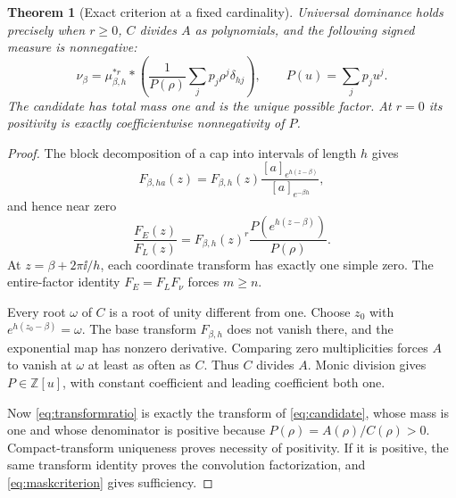 \documentclass[11pt,a4paper]{article}
\newtheorem{theorem}{Theorem}[section]\newtheorem{lemma}[theorem]{Lemma}
\theoremstyle{remark}\newtheorem*{ednote}{Editorial note (ProveIt, 2026-10-01)}
\begin{document}
\begin{theorem}[Exact criterion at a fixed cardinality]\label{thm:fixed}
Universal dominance holds precisely when $r\ge0$, $C$ divides $A$ as polynomials, and the following signed measure is nonnegative:
\begin{equation}\label{eq:candidate}
 \nu_\beta=\mu_{\beta,h}^{*r}*
 \left(\frac1{P(\rho)}\sum_jp_j\rho^j\delta_{hj}\right),
 \qquad P(u)=\sum_jp_ju^j.
\end{equation}
The candidate has total mass one and is the unique possible factor. At $r=0$ its positivity is exactly coefficientwise nonnegativity of $P$.
\end{theorem}
\begin{proof}
The block decomposition of a cap into intervals of length $h$ gives
\[
 F_{\beta,ha}(z)=F_{\beta,h}(z)
 \frac{[a]_{e^{h(z-\beta)}}}{[a]_{e^{-\beta h}}},
\]
and hence near zero
\begin{equation}\label{eq:transformratio}
 \frac{F_E(z)}{F_L(z)}
 =F_{\beta,h}(z)^r\frac{P(e^{h(z-\beta)})}{P(\rho)}.
\end{equation}
At $z=\beta+2\pi\ii/h$, each coordinate transform has exactly one simple zero. The entire-factor identity $F_E=F_LF_\nu$ forces $m\ge n$.

Every root $\omega$ of $C$ is a root of unity different from one. Choose $z_0$ with $e^{h(z_0-\beta)}=\omega$. The base transform $F_{\beta,h}$ does not vanish there, and the exponential map has nonzero derivative. Comparing zero multiplicities forces $A$ to vanish at $\omega$ at least as often as $C$. Thus $C$ divides $A$. Monic division gives $P\in\mathbb Z[u]$, with constant coefficient and leading coefficient both one.

Now \eqref{eq:transformratio} is exactly the transform of \eqref{eq:candidate}, whose mass is one and whose denominator is positive because $P(\rho)=A(\rho)/C(\rho)>0$. Compact-transform uniqueness proves necessity of positivity. If it is positive, the same transform identity proves the convolution factorization, and \eqref{eq:maskcriterion} gives sufficiency.
\end{proof}
\end{document}
